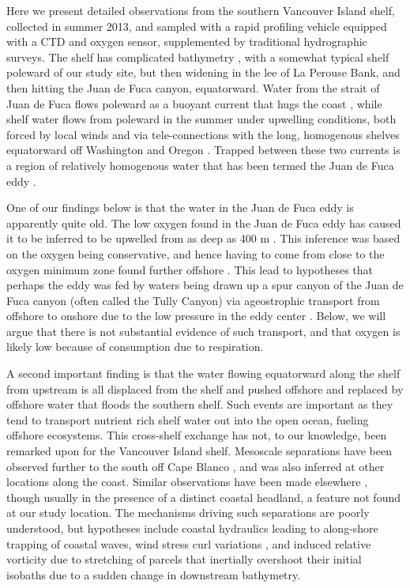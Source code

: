 \documentclass[draft]{agujournal2019}
\begin{document}
Here we present detailed observations from the southern Vancouver Island shelf, collected in summer 2013, and sampled with a rapid profiling vehicle equipped with a CTD and oxygen sensor, supplemented by traditional hydrographic surveys. The shelf has complicated bathymetry , with a somewhat typical shelf poleward of our study site, but then widening in the lee of La Perouse Bank, and then hitting the Juan de Fuca canyon, equatorward.  Water from the strait of Juan de Fuca flows poleward as a buoyant current that hugs the coast \cite{thomsonetal89, hickeyetal91}, while shelf water flows from poleward in the summer under upwelling conditions, both forced by local winds and via tele-connections with the long, homogenous shelves equatorward off Washington and Oregon \cite{hickeyetal91,thomsonkrassovski15,engidaetal16}.  Trapped between these two currents is a region of relatively homogenous water that has been termed the Juan de Fuca eddy \cite{freelanddenman82,freelandmcintosh89,foremanetal07,macfadyenhickey10}.

One of our findings below is that the water in the Juan de Fuca eddy is apparently quite old.  The low oxygen found in the Juan de Fuca eddy has caused it to be inferred to be upwelled from as deep as 400 m \cite{freelanddenman82,deweycrawford88}.  This inference was based on the oxygen being conservative, and hence having to come from close to the oxygen minimum zone found further offshore \cite{mackasetal87}.  This lead to hypotheses that perhaps the eddy was fed by waters being drawn up a spur canyon of the Juan de Fuca canyon (often called the Tully Canyon) via ageostrophic transport from offshore to onshore due to the low pressure in the eddy center \cite{weaverhsieh87}.  Below, we will argue that there is not substantial evidence of such transport, and that oxygen is likely low because of consumption due to respiration.

A second important finding is that the water flowing equatorward along the shelf from upstream is all displaced from the shelf and pushed offshore and replaced by offshore water that floods the southern shelf.  Such events are important as they tend to transport nutrient rich shelf water out into the open ocean, fueling offshore ecosystems.
This cross-shelf exchange has not, to our knowledge, been remarked upon for the Vancouver Island shelf.  Mesoscale separations have been observed further to the south off Cape Blanco \cite{barthetal00}, and was also inferred at other locations along the coast.  Similar observations have been made elsewhere \cite[e.g.]{relvasbarton05}, though usually in the presence of a distinct coastal headland, a feature not found at our study location.  The mechanisms driving such separations are poorly understood, but hypotheses include coastal hydraulics \cite{dalebarth01} leading to along-shore trapping of coastal waves,  wind stress curl variations \cite{castelaobarth07}, and induced relative vorticity due to stretching of parcels that inertially overshoot their initial isobaths due to a sudden change in downstream bathymetry.
\end{document}
